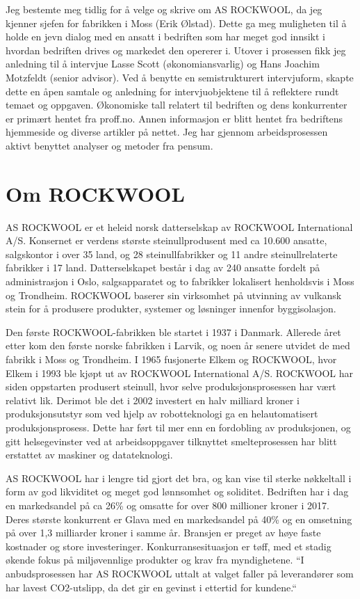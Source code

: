 Jeg bestemte meg tidlig for å velge og skrive om AS ROCKWOOL, da jeg kjenner sjefen for fabrikken i Moss (Erik Ølstad). Dette ga meg muligheten til å holde en jevn dialog med en ansatt i bedriften som har meget god innsikt i hvordan bedriften drives og markedet den opererer i. Utover i prosessen fikk jeg anledning til å intervjue Lasse Scott (økonomiansvarlig) og Hans Joachim Motzfeldt (senior advisor). Ved å benytte en semistrukturert intervjuform, skapte dette en åpen samtale og anledning for intervjuobjektene til å reflektere rundt temaet og oppgaven. Økonomiske tall relatert til bedriften og dens konkurrenter er primært hentet fra proff.no. Annen informasjon er blitt hentet fra bedriftens hjemmeside og diverse artikler på nettet. Jeg har gjennom arbeidsprosessen aktivt benyttet analyser og metoder fra pensum.

\section{Om ROCKWOOL}
AS ROCKWOOL er et heleid norsk datterselskap av ROCKWOOL International A/S. Konsernet er verdens største steinullprodusent med ca 10.600 ansatte, salgskontor i over 35 land, og 28 steinullfabrikker og 11 andre steinullrelaterte fabrikker i 17 land. Datterselskapet består i dag av 240 ansatte fordelt på administrasjon i Oslo, salgsapparatet og to fabrikker lokalisert henholdsvis i Moss og Trondheim. ROCKWOOL baserer sin virksomhet på utvinning av vulkansk stein for å produsere produkter, systemer og løsninger innenfor byggisolasjon.

\indent \newline
Den første ROCKWOOL-fabrikken ble startet i 1937 i Danmark. Allerede året etter kom den første norske fabrikken i Larvik, og noen år senere utvidet de med fabrikk i Moss og Trondheim. I 1965 fusjonerte Elkem og ROCKWOOL, hvor Elkem i 1993 ble kjøpt ut av ROCKWOOL International A/S. ROCKWOOL har siden oppstarten produsert steinull, hvor selve produksjonsprosessen har vært relativt lik. Derimot ble det i 2002 investert en halv milliard kroner i produksjonsutstyr som ved hjelp av robotteknologi ga en helautomatisert produksjonsprosess. Dette har ført til mer enn en fordobling av produksjonen, og gitt helsegevinster ved at arbeidsoppgaver tilknyttet smelteprosessen har blitt erstattet av maskiner og datateknologi.

\indent \newline
AS ROCKWOOL har i lengre tid gjort det bra, og kan vise til sterke nøkkeltall i form av god likviditet og meget god lønnsomhet og soliditet. Bedriften har i dag en markedsandel på ca 26\% og omsatte for over 800 millioner kroner i 2017. Deres største konkurrent er Glava med en markedsandel på 40\% og en omsetning på over 1,3 milliarder kroner i samme år. Bransjen er preget av høye faste kostnader og store investeringer. Konkurransesituasjon er tøff, med et stadig økende fokus på miljøvennlige produkter og krav fra myndighetene. “I anbudsprosessen har AS ROCKWOOL uttalt at valget faller på leverandører som har lavest CO2-utslipp, da det gir en gevinst i ettertid for kundene.“

